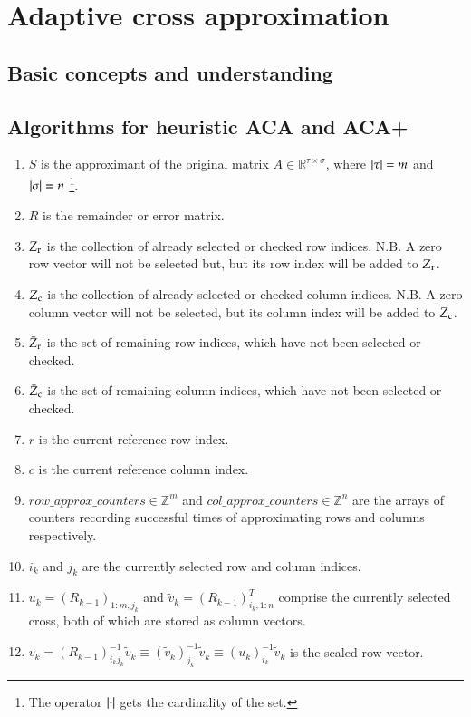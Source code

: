 \documentclass[11pt, a4paper]{article}
\begin{document}
\section{Adaptive cross approximation}
\label{sec:aca}

\subsection{Basic concepts and understanding}

\subsection{Algorithms for heuristic ACA and ACA+}

\begin{enumerate}
\item $S$ is the approximant of the original matrix $A\in\mathbb{R}^{\tau\times\sigma}$,
  where $\lvert\tau\rvert=m$ and $\lvert\sigma\rvert=n$ \footnote{The operator $\lvert\cdot\rvert$ gets the
    cardinality of the set.}.
\item $R$ is the remainder or error matrix.
\item $Z_{\rm r}$ is the collection of already selected or checked row indices. N.B. A
  zero row vector will not be selected but, but its row index will be added to $Z_{\rm r}$.
\item $Z_{\rm c}$ is the collection of already selected or checked column indices. N.B. A
  zero column vector will not be selected, but its column index will be added to $Z_{\rm c}$.
\item $\bar{Z}_{\rm r}$ is the set of remaining row indices, which have not been selected or checked.
\item $\bar{Z}_{\rm c}$ is the set of remaining column indices, which have not been selected or checked.
\item $r$ is the current reference row index.
\item $c$ is the current reference column index.
\item $row\_approx\_counters\in\mathbb{Z}^m$ and $col\_approx\_counters\in\mathbb{Z}^{n}$ are the arrays of counters recording successful times of approximating rows and columns respectively.
\item $i_k$ and $j_k$ are the currently selected row and column indices.
\item $u_k=(R_{k-1})_{1:m,j_k}$ and $\widetilde{v}_k=(R_{k-1})_{i_k,1:n}^T$ comprise the currently selected cross, both of which are stored as column vectors.
\item $v_k=(R_{k-1})_{i_k j_k}^{-1}\widetilde{v}_{k}\equiv (\widetilde{v}_k)_{j_k}^{-1}\widetilde{v}_k \equiv (u_k)_{i_k}^{-1}\widetilde{v}_k$ is the scaled row vector.

\end{enumerate}
\end{document}

